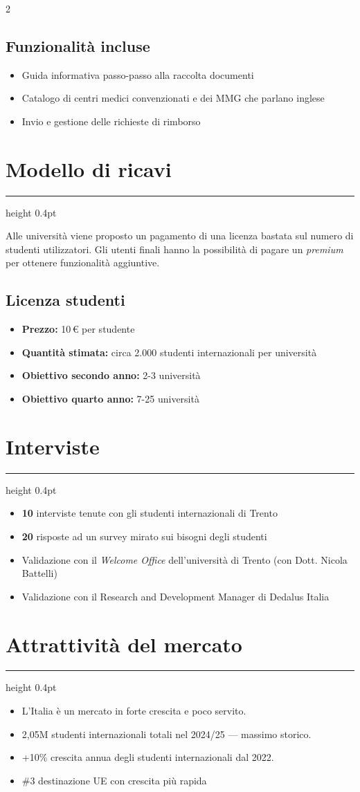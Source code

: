 \documentclass[10pt,a4paper]{scrartcl}
\newcommand{\PosterSection}[1]{%
  \section*{#1}%
  \vspace{0.4em}%
  {\color{accent!35}\hrule height 0.4pt}%
  \vspace{0.25em}%
}
\begin{document}
\begin{multicols*}{2}
\subsection*{Funzionalità incluse}
\begin{itemize}
  \item Guida informativa passo-passo alla raccolta documenti
  \item Catalogo di centri medici convenzionati e dei MMG che parlano inglese
  \item Invio e gestione delle richieste di rimborso
\end{itemize}


\PosterSection{Modello di ricavi}
Alle università viene proposto un pagamento di una licenza bastata sul numero di studenti utilizzatori. Gli utenti finali hanno la possibilità di pagare un \textit{premium} per ottenere funzionalità aggiuntive. 

\subsection*{Licenza studenti}
\begin{itemize}
  \item \textbf{Prezzo:} 10\,€ per studente
  \item \textbf{Quantità stimata:} circa 2.000 studenti internazionali per università
  \item \textbf{Obiettivo secondo anno:} 2-3 università
  \item \textbf{Obiettivo quarto anno:} 7-25 università
\end{itemize}



\PosterSection{Interviste}
\begin{itemize}
  \item \textbf{10} interviste tenute con gli studenti internazionali di Trento
  \item \textbf{20} risposte ad un survey mirato sui bisogni degli studenti
  \item Validazione con il \textit{Welcome Office} dell'università di Trento (con Dott. Nicola Battelli)
  \item Validazione con il Research and Development Manager di Dedalus Italia
\end{itemize}








\PosterSection{Attrattività del mercato}
\begin{itemize}
  \item L’Italia è un mercato in forte crescita e poco servito.
  \item 2,05M studenti internazionali totali nel 2024/25 — massimo storico.
  \item +10\% crescita annua degli studenti internazionali dal 2022.
  \item \#3 destinazione UE con crescita più rapida
\end{itemize}



\end{multicols*}
\end{document}
